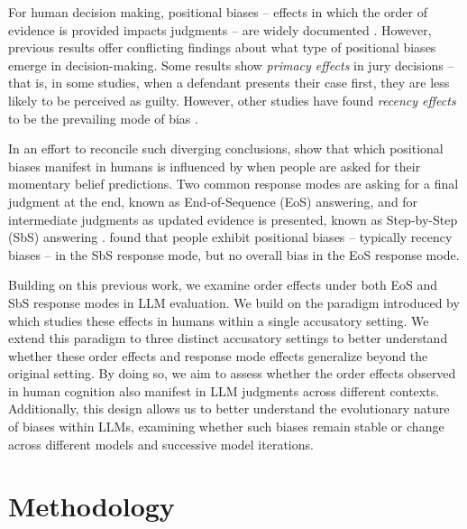\documentclass[11pt, letterpaper]{article}
\begin{document}
For human decision making, positional biases – effects in which the order of evidence is provided impacts judgments – are widely documented \cite{murdock1962serial}. However, previous results offer conflicting findings about what type of positional biases emerge in decision-making. Some results show \emph{primacy effects} in jury decisions \citep{dennis2001primacy, pennington1982witnesses, tetlock1983accountability, wells1985timing} – that is, in some studies, when a defendant presents their case first, they are less likely to be perceived as guilty. However, other studies have found \emph{recency effects} to be the prevailing mode of bias \citep{charman2016evidence, dahl2009investigating, furnham1986robustness, maegherman2022law}.

In an effort to reconcile such diverging conclusions, \citet{qiao2025speak} show that which positional biases manifest in humans is influenced by when people are asked for their momentary belief predictions. Two common response modes are asking for a final judgment at the end, known as End-of-Sequence (EoS) answering, and for intermediate judgments as updated evidence is presented, known as Step-by-Step (SbS) answering \citep{hogarth1992order, kerstholt1998judicial, qiao2025speak}.
\citet{qiao2025speak} found that people exhibit positional biases -- typically recency biases -- in the SbS response mode, but no overall bias in the EoS response mode. %

Building on this previous work, we examine order effects under both EoS and SbS response modes in LLM evaluation. We build on the paradigm introduced by \citet{qiao2025speak} which studies these effects in humans within a single accusatory setting. We extend this paradigm to three distinct accusatory settings to better understand whether these order effects and response mode effects generalize beyond the original setting. By doing so, we aim to assess whether the order effects observed in human cognition also manifest in LLM judgments across different contexts. Additionally, this design allows us to better understand the evolutionary nature of biases within LLMs, examining whether such biases remain stable or change across different models and successive model iterations.

\section{Methodology}
\end{document}
